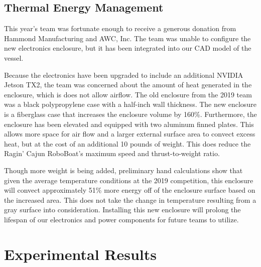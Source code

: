 \documentclass[letterpaper, 12 pt, conference]{ieeeconf}
\begin{document}
\subsection{Thermal Energy Management}
This year's team was fortunate enough to receive a generous donation from Hammond Manufacturing and AWC, Inc. The team was unable to configure the new electronics enclosure, but it has been integrated into our CAD model of the vessel.

Because the electronics have been upgraded to include an additional NVIDIA Jetson TX2, the team was concerned about the amount of heat generated in the enclosure, which is does not allow airflow. The old enclosure from the 2019 team was a black polypropylene case with a half-inch wall thickness. The new enclosure is a fiberglass case that increases the enclosure volume by 160\%. Furthermore, the enclosure has been elevated and equipped with two aluminum finned plates. This allows more space for air flow and a larger external surface area to convect excess heat, but at the cost of an additional 10 pounds of weight. This does reduce the Ragin' Cajun RoboBoat's maximum speed and thrust-to-weight ratio. 

Though more weight is being added, preliminary hand calculations show that given the average temperature conditions at the 2019 competition, this enclosure will convect approximately 51\% more energy off of the enclosure surface based on the increased area. This does not take the change in temperature resulting from a gray surface into consideration. Installing this new enclosure will prolong the lifespan of our electronics and power components for future teams to utilize.

\section{Experimental Results}
\end{document}
